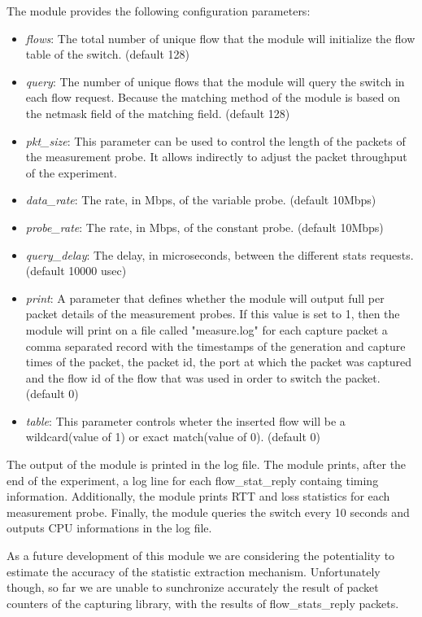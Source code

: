 \documentclass{book}
\begin{document}
The module provides the following configuration parameters:
\begin{itemize}
\item \emph{flows}: The total number of unique flow that the module will
initialize the flow table of the switch. (default 128)
\item \emph{query}: The number of unique flows that the module will query the 
switch in each flow request. Because the matching method of the module is based 
on the netmask field of the matching field. (default 128)
\item \emph{pkt\_size}:  This parameter can be used to control the length of the
packets of the measurement probe. It allows indirectly to adjust the packet
throughput of the experiment.
\item \emph{data\_rate}: The rate, in Mbps, of the variable probe. (default
    10Mbps)
\item \emph{probe\_rate}: The rate, in Mbps, of the constant probe. (default 10Mbps)
\item \emph{query\_delay}: The delay, in microseconds, between the different 
stats requests. (default 10000 usec) 
\item \emph{print}: A parameter that defines whether the module will output full
per packet details of the measurement probes. If this value is set to 1, then
the module will print on a file called "measure.log" for each capture packet a
comma separated record with the timestamps of the generation and capture times of the
packet, the packet id, the port at which the packet was captured and the flow id 
of the flow that was used in order to switch the packet. (default 0)
\item \emph{table}: This parameter controls wheter the inserted flow will be
a wildcard(value of 1) or exact match(value of 0). (default 0)
\end{itemize}

The output of the module is printed in the log file. The module prints, after the
end of the experiment, a log line for each flow\_stat\_reply containg timing
information. Additionally, the module prints RTT and loss statistics for each
measurement probe. Finally, the module queries the switch every 10 seconds and
outputs CPU informations in the log file. 

As a future development of this module we are considering the potentiality to
estimate the accuracy of the statistic extraction mechanism. Unfortunately
though, so far we are unable to sunchronize accurately the result of packet
counters of the capturing library, with the results of flow\_stats\_reply 
packets. 
\end{document}
